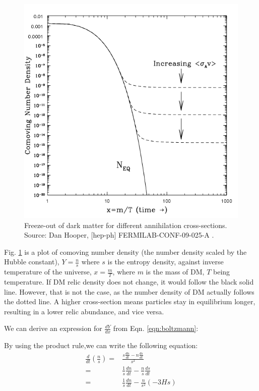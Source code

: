 \documentclass[12pt]{article}
\begin{document}
\begin{figure}
    \includegraphics[width=\linewidth]{Documents/Thesis/Figs/Thermal-freeze-out-of-dark-matter-for-different-annihilation-cross-sections-c-Dan.jpg}
    \caption{Freeze-out of dark matter for different annihilation cross-sections. Source: Dan Hooper, [hep-ph] FERMILAB-CONF-09-025-A \cite{hooper2009tasi2008lecturesdark}.}
    \label{fig:freezeout}
\end{figure}

Fig. \ref{fig:freezeout} is a plot of comoving number density (the number density scaled by the Hubble constant), $Y = \frac{n}{s}$ where $s$ is the entropy density, against inverse temperature of the universe, $x = \frac{m}{T}$, where $m$ is the mass of DM, $T$ being temperature. If DM relic density does not change, it would follow the black solid line. However, that is not the case, as the number density of DM actually follows the dotted line. A higher cross-section means particles stay in equilibrium longer, resulting in a lower relic abundance, and vice versa.

We can derive an expression for $\frac{dY}{dx}$ from Eqn. \ref{eqn:boltzmann}:

By using the product rule,we can write the following equation:
\begin{equation}
    \begin{split}
        \frac{d}{dt} \left(\frac{n}{s} \right) =& \frac{s\frac{dn}{dt} - n\frac{ds}{dt}}{s^2}
        \\=& \frac{1}{s}\frac{dn}{dt} - \frac{n}{s}\frac{ds}{dt}
        \\=& \frac{1}{s}\frac{dn}{dt} - \frac{n}{s^2}(-3Hs)
    \end{split}
    \label{eqn:dydt}
\end{equation}
\end{document}
